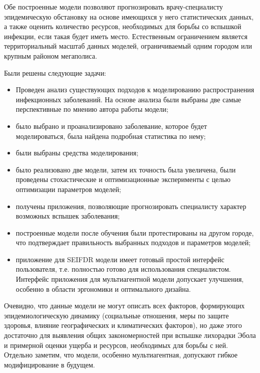 Обе построенные модели позволяют прогнозировать врачу-специалисту эпидемическую обстановку на основе имеющихся у него статистических данных, а также оценить количество ресурсов, необходимых для борьбы со вспышкой инфекции, если такая будет иметь место. Естественным ограничением является территориальный масштаб данных моделей, ограничиваемый одним городом или крупным районом мегаполиса.

Были решены следующие задачи:
\begin{itemize}
	\item Проведен анализ существующих подходов к моделированию распространения инфекционных заболеваний. На основе анализа были выбраны две самые перспективные по мнению автора работы модели;
	\item было выбрано и проанализировано заболевание, которое будет моделироваться, была найдена подробная статистика по нему;
	\item были выбраны средства моделирования;
	\item было реализовано две модели, затем их точность была увеличена, были проведены стохастические и оптимизационные эксперименты с целью оптимизации параметров моделей;
	\item получены приложения, позволяющие прогнозировать специалисту характер возможных вспышек заболевания;
	\item построенные модели после обучения были протестированы на другом городе, что подтверждает правильность выбранных подходов и параметров моделей;
	\item приложение для SEIFDR модели имеет готовый простой интерфейс пользователя, т.е. полностью готово для использования специалистом. Интерфейс приложения для мультиагентной модели допускает  улучшения, особенно в области эргономики и оптимального дизайна.
\end{itemize}

Очевидно, что данные модели не могут описать всех факторов, формирующих эпидемиологическую динамику (социальные отношения, меры по защите здоровья, влияние географических и климатических факторов), но даже этого достаточно для выявления общих закономерностей при вспышке лихорадки Эбола и примерной оценки ущерба и ресурсов, необходимых для борьбы с ней. Отдельно заметим, что модели, особенно мультиагентная, допускают гибкое модифицирование в будущем. 